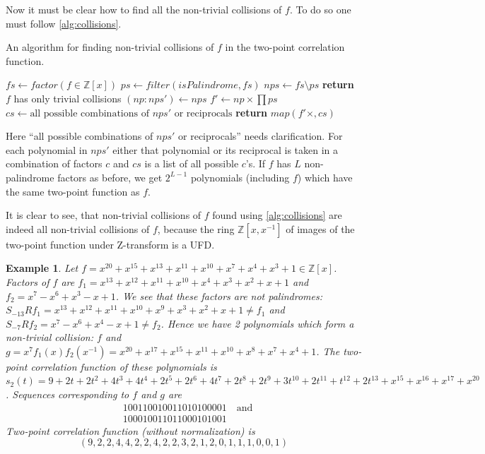 \documentclass[12pt, a4paper]{article}
\newtheorem{example}{Example}
\begin{document}
Now it must be clear how to find all the non-trivial collisions of $f$. To do so
one must follow \cref{alg:collisions}.
\begin{algorithm}
  \caption{An algorithm for finding non-trivial collisions of $f$ in the
    two-point correlation function.}
  \label{alg:collisions}
  \begin{algorithmic}[1]
    \State $fs \gets factor(f \in \mathbb{Z}[x])$
    \State $ps \gets filter(isPalindrome, fs)$
    \State $nps \gets fs \setminus ps$
    \State \textbf{return} $f$ has only trivial collisions
    \EndIf
    \State $(np:nps') \gets nps$
    \State $f' \gets np \times \prod ps$
    \State $cs \gets \text{all possible combinations of $nps'$ or reciprocals}$
    \State \textbf{return} $map(f'\times, cs)$
    \EndProcedure
  \end{algorithmic}
\end{algorithm}
Here ``all possible combinations of $nps'$ or reciprocals'' needs
clarification. For each polynomial in $nps'$ either that polynomial or its
reciprocal is taken in a combination of factors $c$ and $cs$ is a list of all
possible $c$'s. If $f$ has $L$ non-palindrome factors as before, we get
$2^{L-1}$ polynomials (including $f$) which have the same two-point function as
$f$.

It is clear to see, that non-trivial collisions of $f$ found using
\cref{alg:collisions} are indeed all non-trivial collisions of $f$, because the
ring $\mathbb{Z}[x, x^{-1}]$ of images of the two-point function under
Z-transform is a UFD.

\begin{example}
  Let $f = x^{20} + x^{15} + x^{13} + x^{11} + x^{10} + x^7 + x^4 + x^3 + 1 \in \mathbb{Z}[x]$.
  Factors of $f$ are $f_1 = x^{13} + x^{12} + x^{11} + x^{10} + x^4 + x^3 + x^2 + x + 1$
  and $f_2 = x^7 - x^6 + x^3 - x + 1$. We see that these factors are not
  palindromes:
  $S_{-13}R f_1 = x^{13} + x^{12} + x^{11} + x^{10} + x^9 + x^3 + x^2 + x + 1 \ne f_1$ 
  and $S_{-7}R f_2 = x^7 - x^6 + x^4 - x + 1 \ne f_2$. Hence we have 2 polynomials
  which form a non-trivial collision: $f$ and
  $g = x^7 f_1(x) f_2(x^{-1}) = x^{20} + x^{17} + x^{15} + x^{11} + x^{10} + x^8 + x^7 + x^4 + 1$.
  The two-point correlation function of these polynomials is
  $s_2(t) = 9 + 2t + 2t^2 + 4t^3 + 4t^4 + 2t^5 + 2t^6 + 4t^7 + 2t^8 + 2t^9 +
  3t^{10} + 2t^{11} + t^{12} + 2t^{13} + x^{15} + x^{16} + x^{17} + x^{20}$.
  Sequences corresponding to $f$ and $g$ are
  \begin{align*}
    & 100110010011010100001 \quad \text{and} \\
    & 100010011011000101001
  \end{align*}
  Two-point correlation function (without normalization) is
  \begin{equation*}
    (9, 2, 2, 4, 4, 2, 2, 4, 2, 2, 3, 2, 1, 2, 0, 1, 1, 1, 0, 0, 1)
  \end{equation*}
\end{example}
\end{document}
